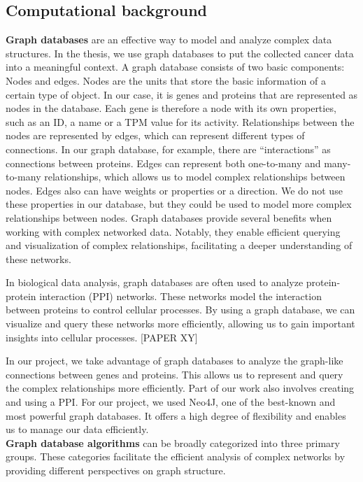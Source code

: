 \subsection{Computational background} \label{subsec:computational_background}
\textbf{Graph databases} are an effective way to model and analyze complex data structures.
In the thesis, we use graph databases to put the collected cancer data into a meaningful context.
A graph database consists of two basic components: Nodes and edges.
Nodes are the units that store the basic information of a certain type of object.
In our case, it is genes and proteins that are represented as nodes in the database.
Each gene is therefore a node with its own properties,
such as an ID, a name or a TPM value for its activity.
Relationships between the nodes are represented by edges, which can represent different types of connections.
In our graph database, for example, there are “interactions” as connections between proteins.
Edges can represent both one-to-many and many-to-many relationships,
which allows us to model complex relationships between nodes.
Edges also can have weights or properties or a direction.
We do not use these properties in our database,
but they could be used to model more complex relationships between nodes.
Graph databases provide several benefits when working with complex networked data.
Notably, they enable efficient querying and visualization of complex relationships,
facilitating a deeper understanding of these networks.

In biological data analysis, graph databases are often used to analyze protein-protein interaction (PPI) networks.
These networks model the interaction between proteins to control cellular processes.
By using a graph database, we can visualize and query these networks more efficiently,
allowing us to gain important insights into cellular processes.
[PAPER XY]

In our project, we take advantage of graph databases to analyze the graph-like connections between genes and proteins.
This allows us to represent and query the complex relationships more efficiently.
Part of our work also involves creating and using a PPI\@.
For our project, we used Neo4J, one of the best-known and most powerful graph databases.
It offers a high degree of flexibility and enables us to manage our data efficiently.
\\

\textbf{Graph database algorithms} can be broadly categorized into three primary groups.
These categories facilitate the efficient analysis of complex networks
by providing different perspectives on graph structure.

